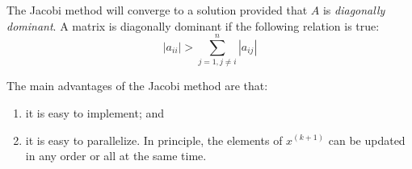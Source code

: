 
The Jacobi method will converge to a solution provided that $A$ is \emph{diagonally dominant}.  A matrix is diagonally dominant if the following relation is true:
\begin{equation*}
|a_{ii}| > \sum\limits_{j=1, j\ne i}^{n} |a_{ij}|
\end{equation*}

The main advantages of the Jacobi method are that:
\begin{enumerate}
\item it is easy to implement; and
\item it is easy to parallelize. In principle, the elements of $x^{(k+1)}$ can be updated in any order or all at the same time.
\end{enumerate}

